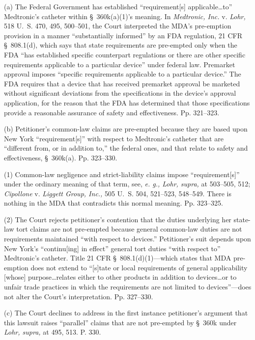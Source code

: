   (a) The Federal Government has established ``requirement[s]
applicable\dots to'' Medtronic's catheter within
\S~360k(a)(1)'s meaning. In \emph{Medtronic, Inc.} v. \emph{Lohr,}
518 U.~S. 470, 495, 500--501, the Court interpreted the MDA's
pre-emption provision in a manner ``substantially informed'' by an FDA
regulation, 21 CFR \S~808.1(d), which says that state requirements are
pre-empted only when the FDA ``has established specific counterpart
regulations or there are other specific requirements applicable to a
particular device'' under federal law. Premarket approval imposes
``specific requirements applicable to a particular device.'' The FDA
requires that a device that has received premarket approval be marketed
without significant deviations from the specifications in the device's
approval application, for the reason that the FDA has determined that
those specifications provide a reasonable assurance of safety and
effectiveness. Pp. 321--323.

  (b) Petitioner's common-law claims are pre-empted because they are
based upon New York ``requirement[s]'' with respect to Medtronic's
catheter that are ``different from, or in addition to,'' the federal
ones, and that relate to safety and effectiveness, \S~360k(a).
Pp. 323--330.

  (1) Common-law negligence and strict-liability claims impose
``requirement[s]'' under the ordinary meaning of that term, see,
\emph{e. g., Lohr, supra,} at 503--505, 512; \emph{Cipollone} v. \emph{Liggett
Group, Inc.,} 505 U.~S. 504, 521--523, 548--549. There is nothing
in the MDA that contradicts this normal meaning. Pp. 323--325.

  (2) The Court rejects petitioner's contention that the duties
underlying her state-law tort claims are not pre-empted because
general common-law duties are not requirements maintained ``with
respect to devices.'' Petitioner's suit depends upon New York's
``continu[ing] in effect'' general tort duties ``with respect to''
Medtronic's catheter. Title 21 CFR \S~808.1(d)(1)---which states that
MDA pre-emption does not extend to ``[s]tate or local requirements of
general applicability [whose] purpose\dots relates either to other
products in addition to devices\dots or to unfair trade practices in
which the requirements are not limited to devices''---does not alter
the Court's interpretation. Pp. 327--330.

  (c) The Court declines to address in the first instance petitioner's
argument that this lawsuit raises ``parallel'' claims that are not
pre-empted by \S~360k under \emph{Lohr, supra,} at 495, 513. P. 330.

